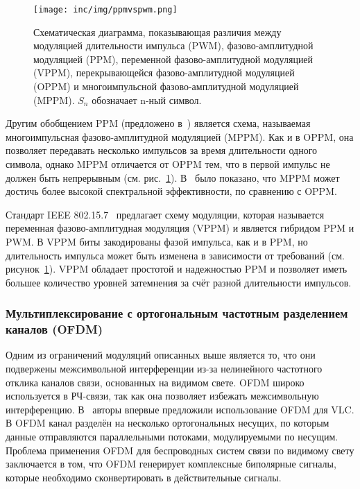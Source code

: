 \begin{figure}[!ht]
    \centering
    \texttt{[image: inc/img/ppmvspwm.png]}
    \caption{Схематическая диаграмма, показывающая различия между модуляцией длительности импульса (PWM), фазово-амплитудной модуляцией (PPM), переменной фазово-амплитудной модуляцией (VPPM), перекрывающейся фазово-амплитудной модуляцией (OPPM) и многоимпульсной фазово-амплитудной модуляцией (MPPM). $S_n$ обозначает n-ный символ.~\cite{Pathak2015}}
    \label{fig:ppmvspwm}
\end{figure}

Другим обобщением PPM (предложено в~\cite{Sugiyama1989}) является схема, называемая многоимпульсная фазово-амплитудной модуляцией (MPPM). Как и в OPPM, она позволяет передавать несколько импульсов за время длительности одного символа, однако MPPM отличается от OPPM тем, что в первой импульс не должен быть непрерывным (см. рис.~\ref{fig:ppmvspwm}). В~\cite{Shiu1999} было показано, что MPPM может достичь более высокой спектральной эффективности, по сравнению с OPPM.


Стандарт IEEE 802.15.7~\cite{IEEE2018} предлагает схему модуляции, которая называется переменная фазово-амплитудная модуляция (VPPM) и является гибридом PPM и PWM. В VPPM биты закодированы фазой импульса, как и в PPM, но длительность импульса может быть изменена в зависимости от требований (см. рисунок~\ref{fig:ppmvspwm}). VPPM обладает простотой и надежностью PPM и позволяет иметь большее количество уровней затемнения за счёт разной длительности импульсов.

\subsubsection{Мультиплексирование с орто­гональным частотным разделением каналов (OFDM)}

Одним из ограничений модуляций описанных выше является то, что они подвержены межсимвольной интерференции из-за нелинейного частотного отклика каналов связи, основанных на видимом свете. OFDM широко используется в РЧ-связи, так как она позволяет избежать межсимвольную интерференцию. В~\cite{Afgani2006} авторы впервые предложили использование OFDM для VLC. В OFDM канал разделён на несколько ортогональных несущих, по которым данные отправляются параллельными потоками, модулируемыми по несущим. Проблема применения OFDM для беспроводных систем связи по видимому свету заключается в том, что OFDM генерирует комплексные биполярные сигналы, которые необходимо сконвертировать в действительные сигналы.

